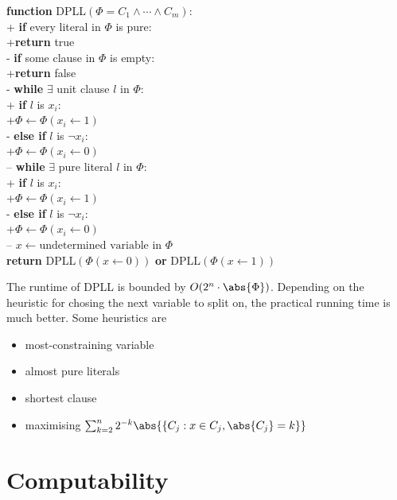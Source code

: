 \documentclass{article}
\begin{document}
\begin{pseudo}
\textbf{function} \textsf{DPLL}$(\Phi=C_1\wedge\cdots\wedge C_m)$:\\+
	\textbf{if} every literal in $\Phi$ is pure:\\+\textbf{return} \textsf{true}\\-
	\textbf{if} some clause in $\Phi$ is empty:\\+\textbf{return} \textsf{false}\\-
	\textbf{while} $\exists$ unit clause $l$ in $\Phi$:\\+
		\textbf{if} $l$ is $x_i$:\\+$\Phi\leftarrow\Phi(x_i\leftarrow 1)$\\-
		\textbf{else if} $l$ is $\neg x_i$:\\+$\Phi\leftarrow\Phi(x_i\leftarrow 0)$\\--
	\textbf{while} $\exists$ pure literal $l$ in $\Phi$:\\+
		\textbf{if} $l$ is $x_i$:\\+$\Phi\leftarrow\Phi(x_i\leftarrow 1)$\\-
		\textbf{else if} $l$ is $\neg x_i$:\\+$\Phi\leftarrow\Phi(x_i\leftarrow 0)$\\--
    $x\leftarrow\text{undetermined variable in }\Phi$\\
	\textbf{return} \textsf{DPLL}$(\Phi(x\leftarrow 0))$ 
	\textbf{or}     \textsf{DPLL}$(\Phi(x\leftarrow 1))$
\end{pseudo}

\begin{theorem}
	The runtime of DPLL is bounded by $O(2^n\cdot\abs{\Phi})$. Depending on the
	heuristic for chosing the next variable to split on, the practical running
	time is much better. Some heuristics are
	\begin{itemize}
		\item most-constraining variable
		\item almost pure literals
		\item shortest clause
		\item maximising $\sum_{k=2}^n 2^{-k} \abs{\{C_j : x\in C_j, \abs{C_j}=k\}}$
	\end{itemize}
\end{theorem}

\section{Computability}
\end{document}
